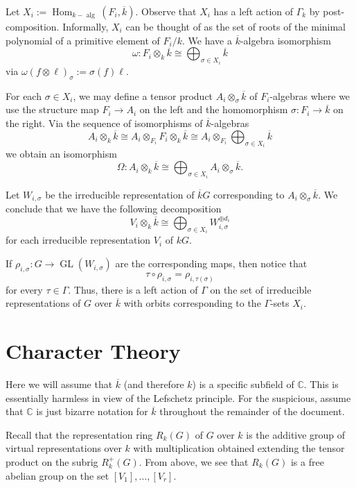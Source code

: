 \documentclass[12pt]{article}
\theoremstyle{plain}
\theoremstyle{definition}
\theoremstyle{remark}
\numberwithin{equation}{section}
\begin{document}
Let $X_i :=
\operatorname{Hom}_{k-\operatorname{alg}}(F_i,\overline{k})$.
Observe that $X_i$ has a left action of $\Gamma_k$ by
post-composition.
Informally, $X_i$ can be thought of as the set of roots of the minimal
polynomial of a primitive element of $F_i/k$.
We have a $\overline{k}$-algebra isomorphism
\[
\omega : F_i \otimes_k \overline{k} \cong
\bigoplus_{\sigma \in X_i} \overline{k}
\]
via $\omega(f \otimes \ell)_{\sigma} := \sigma(f)\ell$.

For each $\sigma \in X_i$, we may define a tensor product
$A_i \otimes_\sigma \overline{k}$ of $F_i$-algebras
where we use the structure map $F_i \to A_i$ on the left and
the homomorphism $\sigma : F_i \to \overline{k}$ on the right.
Via the sequence of isomorphisms of $\overline{k}$-algebras
\[
A_i \otimes_k \overline{k} \cong 
A_i \otimes_{F_i} F_i \otimes_k \overline{k}
\cong A_i \otimes_{F_i} \bigoplus_{\sigma \in X_i} \overline{k}
\]
we obtain an isomorphism
\[
\Omega : A_i \otimes_k \overline{k} \cong
\bigoplus_{\sigma \in X_i} A_i \otimes_\sigma \overline{k} .
\]

Let $W_{i,\sigma}$ be the irreducible representation
of $\overline{k}G$ corresponding to $A_i \otimes_\sigma \overline{k}$.
We conclude that we have the following decomposition
\[
V_i \otimes_k \overline{k} \cong
\bigoplus_{\sigma \in X_i} W_{i,\sigma}^{\oplus d_i}
\]
for each irreducible representation $V_i$ of $kG$.

If $\rho_{i,\sigma} : G \to \operatorname{GL}(W_{i,\sigma})$ are
the corresponding maps, then notice that
\[
\tau \circ \rho_{i,\sigma} = \rho_{i,\tau(\sigma)}
\]
for every $\tau \in \Gamma$.
Thus, there is a left action of $\Gamma$ on the set of irreducible
representations of $G$ over $\overline{k}$
with orbits corresponding to the $\Gamma$-sets $X_i$.

\section{Character Theory}

Here we will assume that $\overline{k}$ (and therefore $k$)
is a specific subfield of $\mathbb{C}$.
This is essentially harmless in view of the Lefschetz principle.
For the suspicious, assume that $\mathbb{C}$ is just bizarre notation for
$\overline{k}$ throughout the remainder of the document.

Recall that the representation ring $R_k(G)$ of $G$ over $k$
is the additive group of virtual representations over $k$
with multiplication obtained extending the tensor product
on the subrig $R_k^+(G)$.
From above, we see that $R_k(G)$ is a free abelian group
on the set $[V_1],\ldots,[V_r]$.
\end{document}
